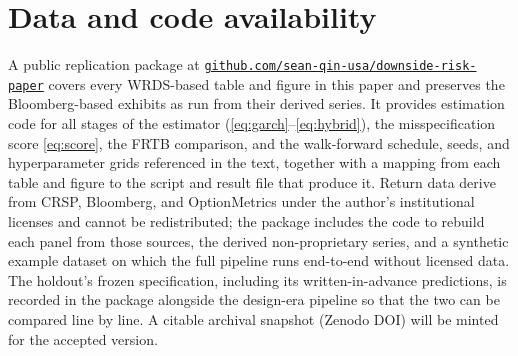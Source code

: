 \documentclass[11pt]{article}
\theoremstyle{remark}
\begin{document}
\section*{Data and code availability}
A public replication package at
\href{https://github.com/sean-qin-usa/downside-risk-paper}{\texttt{github.com/sean-qin-usa/downside-risk-paper}}
covers every WRDS-based table and figure in this paper and preserves
the Bloomberg-based exhibits as run from their derived series. It
provides estimation code for all stages of the estimator
(\eqref{eq:garch}--\eqref{eq:hybrid}), the misspecification score
\eqref{eq:score}, the FRTB comparison, and the walk-forward schedule, seeds, and hyperparameter grids
referenced in the text, together with a mapping from each table and
figure to the script and result file that produce it. Return data
derive from CRSP, Bloomberg, and OptionMetrics under the author's
institutional licenses and cannot be redistributed; the package
includes the code to rebuild each panel from those sources, the derived
non-proprietary series, and a synthetic example dataset on which the
full pipeline runs end-to-end without licensed data. The holdout's
frozen specification, including its written-in-advance predictions, is
recorded in the package alongside the design-era pipeline so that the
two can be compared line by line. A citable archival snapshot (Zenodo
DOI) will be minted for the accepted version.





\end{document}
